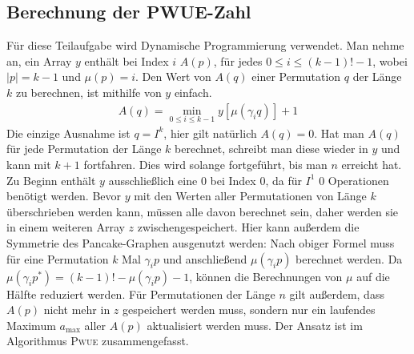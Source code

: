 \documentclass[a4paper, 10pt, ngerman]{article}
\begin{document}
\subsection{Berechnung der PWUE-Zahl}

Für diese Teilaufgabe wird Dynamische Programmierung verwendet. Man nehme an, ein Array $y$ enthält bei Index $i$ $A(p)$, für jedes $0 \le i \le (k - 1)! - 1$, wobei $|p| = k - 1$ und $\mu(p) = i$. Den Wert von $A(q)$ einer Permutation $q$ der Länge $k$ zu berechnen, ist mithilfe von $y$ einfach.
\begin{align*}
    A(q) = \min_{0 \le i \le k - 1}  y[\mu(\gamma_i q)] + 1
\end{align*}
Die einzige Ausnahme ist $q = I^k$, hier gilt natürlich $A(q) = 0$. Hat man $A(q)$ für jede Permutation der Länge $k$ berechnet, schreibt man diese wieder in $y$ und kann mit $k + 1$ fortfahren. Dies wird solange fortgeführt, bis man $n$ erreicht hat. Zu Beginn enthält $y$ ausschließlich eine 0 bei Index 0, da für $I^1$ 0 Operationen benötigt werden. Bevor $y$ mit den Werten aller Permutationen von Länge $k$ überschrieben werden kann, müssen alle davon berechnet sein, daher werden sie in einem weiteren Array $z$ zwischengespeichert. Hier kann außerdem die Symmetrie des Pancake-Graphen ausgenutzt werden: Nach obiger Formel muss für eine Permutation $k$ Mal $\gamma_i p$ und anschließend $\mu(\gamma_i p)$ berechnet werden. Da $\mu(\gamma_i p^*) = (k - 1)! - \mu(\gamma_i p) - 1$, können die Berechnungen von $\mu$ auf die Hälfte reduziert werden. Für Permutationen der Länge $n$ gilt außerdem, dass $A(p)$ nicht mehr in $z$ gespeichert werden muss, sondern nur ein laufendes Maximum $a_{\max}$ aller $A(p)$ aktualisiert werden muss. Der Ansatz ist im Algorithmus \textsc{Pwue} zusammengefasst.
\end{document}

